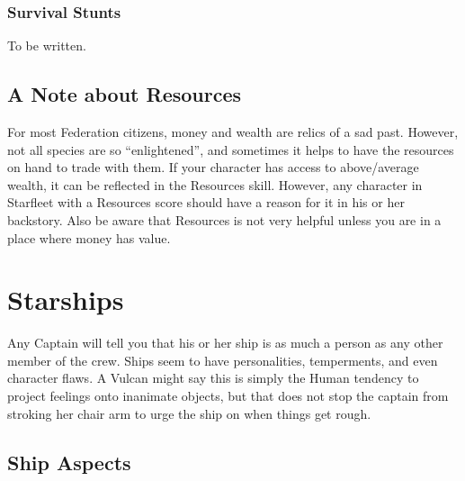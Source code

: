 \documentclass[12pt,titlepage,openany]{book}
\begin{document}
\begin{SkillActionList}



\end{SkillActionList}

\subsection*{Survival Stunts}\label{subsec:survival-stunts}

To be written.

\section{A Note about Resources}\label{sec:note-resources}

For most Federation citizens, money and wealth are relics of a sad past.
However, not all species are so ``enlightened'', and sometimes it helps to have
the resources on hand to trade with them. If your character has access to
above\-/average wealth, it can be reflected in the Resources skill. However,
any character in Starfleet with a Resources score should have a reason for it
in his or her backstory. Also be aware that Resources is not very helpful
unless you are in a place where money has value.



\chapter{Starships}\label{chap:starships}

Any Captain will tell you that his or her ship is as much a person as any other
member of the crew. Ships seem to have personalities, temperments, and even
character flaws. A Vulcan might say this is simply the Human tendency to
project feelings onto inanimate objects, but that does not stop the captain
from stroking her chair arm to urge the ship on when things get rough.

\section{Ship Aspects}\label{sec:ship-aspects}
\end{document}
